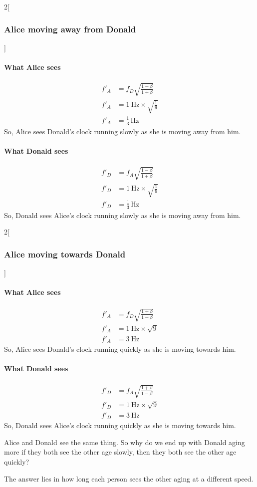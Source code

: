		\begin{samepagecols}{2}[\subsubsection{Alice moving away from Donald}]
			\paragraph{What Alice sees}
			\begin{align*}
				f'_A &= f_D\sqrt{\frac{1 - \beta}{1 + \beta}}\\
				f'_A &= \SI{1}{\Hz} \times \sqrt{\frac{1}{9}}\\
				f'_A &= \frac{1}{3}\,\si{\Hz}
			\end{align*}
			So, Alice sees Donald's clock running slowly as she is moving away from him.

			\columnbreak

			\paragraph{What Donald sees}
			\begin{align*}
				f'_D &= f_A\sqrt{\frac{1 - \beta}{1 + \beta}}\\
				f'_D &= \SI{1}{\Hz} \times \sqrt{\frac{1}{9}}\\
				f'_D &= \frac{1}{3}\,\si{\Hz}
			\end{align*}
			So, Donald sees Alice's clock running slowly as she is moving away from him.
		\end{samepagecols}
		\begin{samepagecols}{2}[\subsubsection{Alice moving towards Donald}]
			\paragraph{What Alice sees}
			\begin{align*}
				f'_A &= f_D\sqrt{\frac{1 + \beta}{1 - \beta}}\\
				f'_A &= \SI{1}{\Hz} \times \sqrt{9}\\
				f'_A &= \SI{3}{\Hz}
			\end{align*}
			So, Alice sees Donald's clock running quickly as she is moving towards him.

			\columnbreak

			\paragraph{What Donald sees}
			\begin{align*}
				f'_D &= f_A\sqrt{\frac{1 + \beta}{1 - \beta}}\\
				f'_D &= \SI{1}{\Hz} \times \sqrt{9}\\
				f'_D &= \SI{3}{\Hz}
			\end{align*}
			So, Donald sees Alice's clock running quickly as she is moving towards him.
		\end{samepagecols}
		Alice and Donald see the same thing.
		So why do we end up with Donald aging more if they both see the other age slowly, then they both see the other age quickly?

		The answer lies in how long each person sees the other aging at a different speed.
